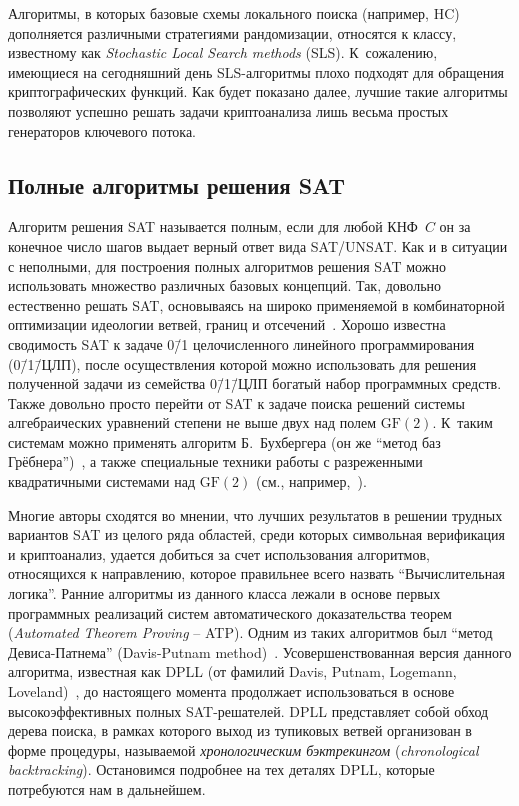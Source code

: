 Алгоритмы, в которых базовые схемы локального поиска (например, HC) дополняется различными стратегиями рандомизации, относятся к классу, известному как \textit{Stochastic Local Search methods} (SLS).
К~сожалению, имеющиеся на сегодняшний день SLS-алгоритмы плохо подходят для обращения криптографических функций.
Как будет показано далее, лучшие такие алгоритмы позволяют успешно решать задачи криптоанализа лишь весьма простых генераторов ключевого потока.


\subsection{Полные алгоритмы решения SAT}
\label{sub:sat-algorithms-complete}

Алгоритм решения SAT называется полным, если для любой КНФ~$C$ он за конечное число шагов выдает верный ответ вида SAT/UNSAT.
Как и в ситуации с неполными, для построения полных алгоритмов решения SAT можно использовать множество различных базовых концепций.
Так, довольно естественно решать SAT, основываясь на широко применяемой в комбинаторной оптимизации идеологии ветвей, границ и отсечений~\cite{papadimitriou1982}.
Хорошо известна сводимость SAT к задаче 0\=/1 целочисленного линейного программирования (0\=/1\=/ЦЛП), после осуществления которой можно использовать для решения полученной задачи из семейства 0\=/1\=/ЦЛП богатый набор программных средств.
Также довольно просто перейти от SAT к задаче поиска решений системы алгебраических уравнений степени не выше двух над полем $\mathrm{GF}(2)$.
К~таким системам можно применять алгоритм Б.~Бухбергера (он же \enquote{метод баз Грёбнера})~\cite{buchberger2006}, а также специальные техники работы с разреженными квадратичными системами над $\mathrm{GF}(2)$ (см., например,~\cite{goos1999,courtois2002}).

Многие авторы сходятся во мнении, что лучших результатов в решении трудных вариантов SAT из целого ряда областей, среди которых символьная верификация и криптоанализ, удается добиться за счет использования алгоритмов, относящихся к направлению, которое правильнее всего назвать \enquote{Вычислительная логика}.
Ранние алгоритмы из данного класса лежали в основе первых программных реализаций систем автоматического доказательства теорем (\textit{Automated Theorem Proving} \--- ATP).
Одним из таких алгоритмов был \enquote{метод Девиса-Патнема} (Davis-Putnam method)~\cite{davis1960}.
Усовершенствованная версия данного алгоритма, известная как DPLL (от фамилий Davis, Putnam, Logemann, Loveland)~\cite{davis1962}, до настоящего момента продолжает использоваться в основе высокоэффективных полных SAT-решателей.
DPLL представляет собой обход дерева поиска, в рамках которого выход из тупиковых ветвей организован в форме процедуры, называемой \textit{хронологическим бэктрекингом} (\textit{chronological backtracking}).
Остановимся подробнее на тех деталях DPLL, которые потребуются нам в дальнейшем.



